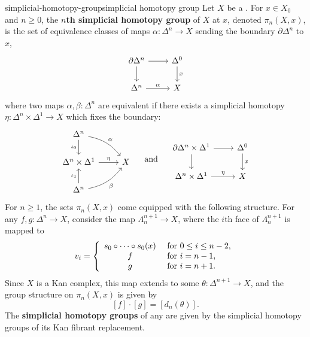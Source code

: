 \begin{topic}{simplicial-homotopy-group}{simplicial homotopy group}
    Let $X$ be a .
    For $x \in X_0$ and $n \ge 0$, the \textbf{$n$th simplicial homotopy group} of $X$ at $x$, denoted $\pi_n(X, x)$, is the set of equivalence classes of maps $\alpha : \Delta^n \to X$ sending the boundary $\partial \Delta^n$ to $x$,
    \[ \begin{tikzcd} \partial \Delta^n \arrow{d} \arrow{r} & \Delta^0 \arrow{d}{x} \\ \Delta^n \arrow{r}{\alpha} & X \end{tikzcd} \]
    where two maps $\alpha, \beta : \Delta^n$ are equivalent if there exists a simplicial homotopy $\eta : \Delta^n \times \Delta^1 \to X$ which fixes the boundary:
    \[ \begin{tikzcd} \Delta^n \arrow[swap]{d}{\iota_0} \arrow[bend left=20]{dr}{\alpha} & \\ \Delta^n \times \Delta^1 \arrow{r}{\eta} & X \\ \Delta^n \arrow{u}{\iota_1} \arrow[swap, bend right=20]{ru}{\beta} \end{tikzcd} \quad \textup{ and } \quad \begin{tikzcd} \partial \Delta^n \times \Delta^1 \arrow{d} \arrow{r} & \Delta^0 \arrow{d}{x} \\ \Delta^n \times \Delta^1 \arrow{r}{\eta} & X \end{tikzcd} \]
    For $n \ge 1$, the sets $\pi_n(X, x)$ come equipped with the following  structure. For any $f, g : \Delta^n \to X$, consider the map $\Lambda^{n + 1}_n \to X$, where the $i$th face of $\Lambda^{n + 1}_n$ is mapped to
    \[ v_i = \left\{ \begin{array}{cl}
        s_0 \circ \cdots \circ s_0 (x) & \textup{ for } 0 \le i \le n - 2, \\
        f & \textup{ for } i = n - 1, \\
        g & \textup{ for } i = n + 1.
    \end{array} \right. \]
    Since $X$ is a Kan complex, this map extends to some $\theta : \Delta^{n + 1} \to X$, and the group structure on $\pi_n(X, x)$ is given by
    \[ [f] \cdot [g] = [d_n(\theta)] . \]
    The \textbf{simplicial homotopy groups} of any  are given by the simplicial homotopy groups of its Kan fibrant replacement.
\end{topic}

